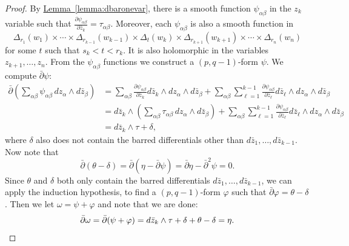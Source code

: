 \documentclass[12pt,openany]{book}
\theoremstyle{plain}
\theoremstyle{remark}
\theoremstyle{definition}
\theoremstyle{exercise}
\theoremstyle{example}
\newcommand{\lemmaref}[1]{\hyperref[#1]{Lemma~\ref*{#1}}}
\begin{document}
\begin{proof}
By \lemmaref{lemma:dbaronevar}, there is a smooth function
$\psi_{\alpha\beta}$ in the
$z_k$ variable such that $\frac{\partial \psi_{\alpha\beta}}{\partial \bar{z}_k} =
\tau_{\alpha \beta}$.  Moreover, each $\psi_{\alpha\beta}$ is also a smooth function
in
\begin{equation*}
\Delta_{r_1}(w_1)
\times \cdots \times
\Delta_{r_{k-1}}(w_{k-1})
\times
\Delta_{t}(w_{k})
\times
\Delta_{r_{k+1}}(w_{k+1})
\times \cdots \times
\Delta_{r_{n}}(w_{n})
\end{equation*}
for some $t$ such that $s_k < t < r_k$.
It is also holomorphic in the variables $z_{k+1},\ldots,z_n$.
From the $\psi_{\alpha\beta}$ functions we construct a $(p,q-1)$-form $\psi$.
We compute $\bar{\partial}\psi$:
\begin{equation*}
\begin{split}
\bar{\partial} \left(
\sum_{\alpha \beta}
\psi_{\alpha\beta} \, dz_\alpha \wedge d\bar{z}_\beta
\right)
& =
\sum_{\alpha \beta}
\frac{\partial \psi_{\alpha\beta}}{\partial \bar{z}_k} d\bar{z}_k
\wedge dz_\alpha \wedge d\bar{z}_\beta
+
\sum_{\alpha \beta}
\sum_{\ell=1}^{k-1}
\frac{\partial \psi_{\alpha\beta}}{\partial \bar{z}_\ell} d\bar{z}_\ell
\wedge dz_\alpha \wedge d\bar{z}_\beta
\\
& =
d\bar{z}_k
\wedge
\left(
\sum_{\alpha \beta}
\tau_{\alpha\beta}
\,
dz_\alpha \wedge d\bar{z}_\beta
\right)
+
\sum_{\alpha \beta}
\sum_{\ell=1}^{k-1}
\frac{\partial \psi_{\alpha\beta}}{\partial \bar{z}_\ell} d\bar{z}_\ell
\wedge dz_\alpha \wedge d\bar{z}_\beta
\\
& =
d\bar{z}_k \wedge \tau + \delta ,
\end{split}
\end{equation*}
where $\delta$ also does not contain
the barred differentials other than $d\bar{z}_1,\ldots,d\bar{z}_{k-1}$.
Now note that
\begin{equation*}
\bar{\partial}(\theta-\delta)
=
\bar{\partial}(\eta-\bar{\partial} \psi)
=
\bar{\partial}\eta-\bar{\partial}^2 \psi = 0 .
\end{equation*}
Since $\theta$ and $\delta$ both only contain the barred differentials
$d\bar{z}_1,\ldots,d\bar{z}_{k-1}$, we can apply the
induction hypothesis, to find a $(p,q-1)$-form $\varphi$ such that
$\bar{\partial} \varphi = \theta-\delta$.  Then we let
$\omega = \psi+\varphi$ and note that we are done:
\begin{equation*}
\bar{\partial} \omega
=
\bar{\partial} (\psi+\varphi )
=
d\bar{z}_k \wedge \tau + \delta + \theta - \delta
=
\eta .
\qedhere
\end{equation*}
\end{proof}
\end{document}

